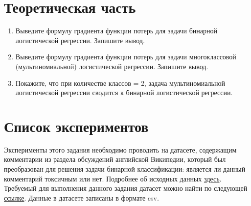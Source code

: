 \documentclass[10pt,fleqn]{article}
\begin{document}
\section*{Теоретическая часть}

\begin{enumerate}
\item Выведите формулу градиента функции потерь для задачи бинарной логистической регрессии. Запишите вывод.

\item Выведите формулу градиента функции потерь для задачи многоклассовой (мультиномиальной) логистической регрессии. Запишите вывод.

\item Покажите, что при количестве классов = 2, задача мультиномиальной логистической регрессии сводится к бинарной логистической регрессии.
\end{enumerate}

\section*{Список экспериментов}

Эксперименты этого задания необходимо проводить на датасете, содержащим комментарии из раздела обсуждений английской Википедии, который был преобразован для решения задачи бинарной классификации: является ли данный комментарий токсичным или нет. Подробнее об исходных данных \href{https://www.kaggle.com/c/jigsaw-toxic-comment-classification-challenge}{здесь}.
Требуемый для выполнения данного задания датасет можно найти по следующей \href{https://drive.google.com/open?id=1a-O_gckKyVRQPF5RhBxo-RnZBEGpezE0}{ссылке}. Данные в датасете записаны в формате csv.
\end{document}
